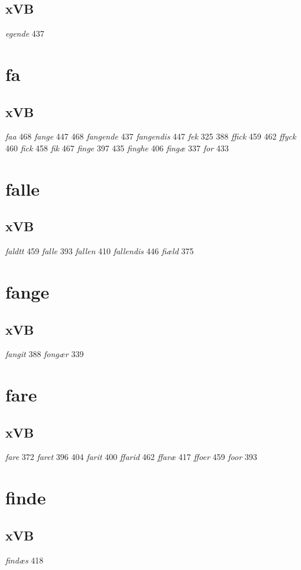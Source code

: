 \documentclass[a4paper,twocolumn]{article}
\begin{document}
\subsection{xVB}
\label{sec:org6800032}
\emph{egende} 437 
\section{fa}
\label{sec:orgefeef4b}
\subsection{xVB}
\label{sec:orgf4d84b0}
\emph{faa} 468 \emph{fange} 447 468 \emph{fangende} 437 \emph{fangendis} 447 \emph{fek} 325 388 \emph{ffick} 459 462 \emph{ffyck} 460 \emph{fick} 458 \emph{fik} 467 \emph{finge} 397 435 \emph{finghe} 406 \emph{fingæ} 337 \emph{for} 433 
\section{falle}
\label{sec:orge556e32}
\subsection{xVB}
\label{sec:org58634d7}
\emph{faldtt} 459 \emph{falle} 393 \emph{fallen} 410 \emph{fallendis} 446 \emph{fiæld} 375 
\section{fange}
\label{sec:org249ffaf}
\subsection{xVB}
\label{sec:org4fec682}
\emph{fangit} 388 \emph{fongær} 339 
\section{fare}
\label{sec:org0a9b720}
\subsection{xVB}
\label{sec:org80e5867}
\emph{fare} 372 \emph{faret} 396 404 \emph{farit} 400 \emph{ffarid} 462 \emph{ffaræ} 417 \emph{ffoer} 459 \emph{foor} 393 
\section{finde}
\label{sec:orgd0dba97}
\subsection{xVB}
\label{sec:orgdc00362}
\emph{findæs} 418 
\end{document}
